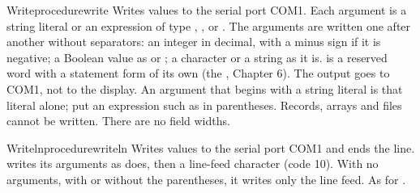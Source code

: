 \begin{LibEntry}{Write}{procedure}{write}
\LFunction Writes values to the serial port COM1.
\LDeclaration {}
\LRemarks Each argument is a string literal or an expression of type
, ,  or .  The arguments are
written one after another without separators: an integer in decimal, with
a minus sign if it is negative; a Boolean value as  or
; a character or a string as it is.   is a
reserved word with a statement form of its own (the , Chapter 6).  The output goes to COM1, not to the display.
\LRestrictions An argument that begins with a string literal is that
literal alone; put an expression such as  in parentheses.
Records, arrays and files cannot be written.  There are no field widths.
\LSeeAlso {}
\LExample
{}
\end{LibEntry}

\begin{LibEntry}{Writeln}{procedure}{writeln}
\LFunction Writes values to the serial port COM1 and ends the line.
\LDeclaration {}
\LRemarks {} writes its arguments as 
does, then a line-feed character (code 10).  With no arguments, with or
without the parentheses, it writes only the line feed.
\LRestrictions As for .
\LSeeAlso {}
\LExample
{}
\end{LibEntry}
